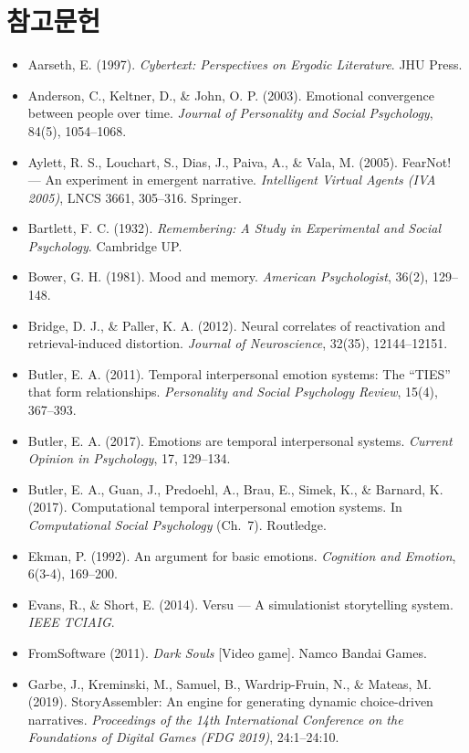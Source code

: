 \documentclass[11pt, a4paper]{article}
\begin{document}
\section*{참고문헌}
\small
\begin{itemize}
  \item Aarseth, E. (1997). \textit{Cybertext: Perspectives on Ergodic Literature}. JHU Press.
  \item Anderson, C., Keltner, D., \& John, O. P. (2003). Emotional convergence between people over time. \textit{Journal of Personality and Social Psychology}, 84(5), 1054--1068.
  \item Aylett, R. S., Louchart, S., Dias, J., Paiva, A., \& Vala, M. (2005). FearNot! --- An experiment in emergent narrative. \textit{Intelligent Virtual Agents (IVA 2005)}, LNCS 3661, 305--316. Springer.
  \item Bartlett, F. C. (1932). \textit{Remembering: A Study in Experimental and Social Psychology}. Cambridge UP.
  \item Bower, G. H. (1981). Mood and memory. \textit{American Psychologist}, 36(2), 129--148.
  \item Bridge, D. J., \& Paller, K. A. (2012). Neural correlates of reactivation and retrieval-induced distortion. \textit{Journal of Neuroscience}, 32(35), 12144--12151.
  \item Butler, E. A. (2011). Temporal interpersonal emotion systems: The ``TIES'' that form relationships. \textit{Personality and Social Psychology Review}, 15(4), 367--393.
  \item Butler, E. A. (2017). Emotions are temporal interpersonal systems. \textit{Current Opinion in Psychology}, 17, 129--134.
  \item Butler, E. A., Guan, J., Predoehl, A., Brau, E., Simek, K., \& Barnard, K. (2017). Computational temporal interpersonal emotion systems. In \textit{Computational Social Psychology} (Ch.~7). Routledge.
  \item Ekman, P. (1992). An argument for basic emotions. \textit{Cognition and Emotion}, 6(3-4), 169--200.
  \item Evans, R., \& Short, E. (2014). Versu --- A simulationist storytelling system. \textit{IEEE TCIAIG}.
  \item FromSoftware (2011). \textit{Dark Souls} [Video game]. Namco Bandai Games.
  \item Garbe, J., Kreminski, M., Samuel, B., Wardrip-Fruin, N., \& Mateas, M. (2019). StoryAssembler: An engine for generating dynamic choice-driven narratives. \textit{Proceedings of the 14th International Conference on the Foundations of Digital Games (FDG 2019)}, 24:1--24:10.

\end{itemize}
\end{document}
